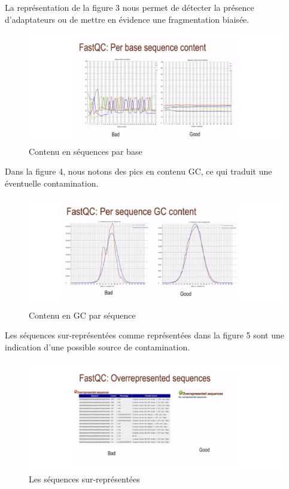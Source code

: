 \documentclass[a4paper,11pt]{article}
\begin{document}
La représentation de la figure 3 nous permet de détecter la présence d'adaptateurs ou de mettre en évidence une fragmentation biaisée.

\begin{figure}
  \begin{center}
    \includegraphics[width=16cm]{Images/Fastqc_Plots3}
  \end{center}
  \caption{Contenu en séquences par base}
  \label{fig-Fastqc_Plots3}
\end{figure}

Dans la figure 4, nous notons des pics en contenu GC, ce qui traduit une éventuelle contamination.

\begin{figure}
  \begin{center}
    \includegraphics[width=16cm]{Images/Fastqc_Plots4}
  \end{center}
  \caption{Contenu en GC par séquence}
  \label{fig-Fastqc_Plots4}
\end{figure}

Les séquences sur-représentées comme représentées dans la figure 5 sont une indication d'une possible source de contamination.

\begin{figure}
  \begin{center}
    \includegraphics[width=16cm]{Images/Fastqc_Plots5}
  \end{center}
  \caption{Les séquences sur-représentées}
  \label{fig-Fastqc_Plots5}
\end{figure}
\end{document}
